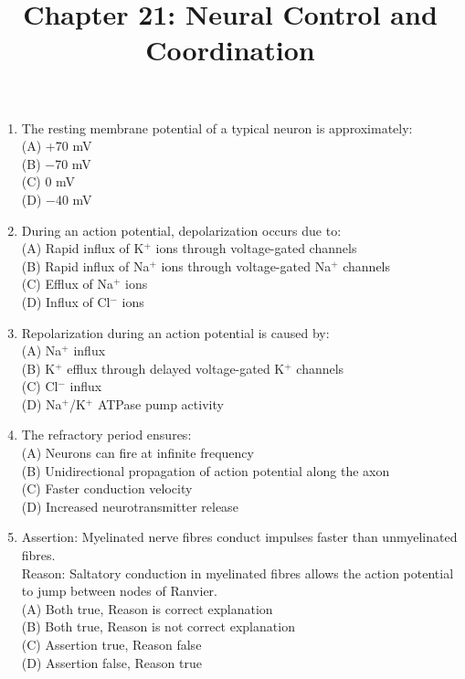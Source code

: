 \documentclass{article}
\begin{document}
\title{Chapter 21: Neural Control and Coordination}
\date{}
\maketitle

\begin{enumerate}[label=Q\arabic*.]

\item The resting membrane potential of a typical neuron is approximately:
\\(A) +70 mV
\\(B) $-$70 mV
\\(C) 0 mV
\\(D) $-$40 mV

\item During an action potential, depolarization occurs due to:
\\(A) Rapid influx of K$^+$ ions through voltage-gated channels
\\(B) Rapid influx of Na$^+$ ions through voltage-gated Na$^+$ channels
\\(C) Efflux of Na$^+$ ions
\\(D) Influx of Cl$^-$ ions

\item Repolarization during an action potential is caused by:
\\(A) Na$^+$ influx
\\(B) K$^+$ efflux through delayed voltage-gated K$^+$ channels
\\(C) Cl$^-$ influx
\\(D) Na$^+$/K$^+$ ATPase pump activity

\item The refractory period ensures:
\\(A) Neurons can fire at infinite frequency
\\(B) Unidirectional propagation of action potential along the axon
\\(C) Faster conduction velocity
\\(D) Increased neurotransmitter release

\item Assertion: Myelinated nerve fibres conduct impulses faster than unmyelinated fibres.\\
Reason: Saltatory conduction in myelinated fibres allows the action potential to jump between nodes of Ranvier.
\\(A) Both true, Reason is correct explanation
\\(B) Both true, Reason is not correct explanation
\\(C) Assertion true, Reason false
\\(D) Assertion false, Reason true


\end{enumerate}
\end{document}

